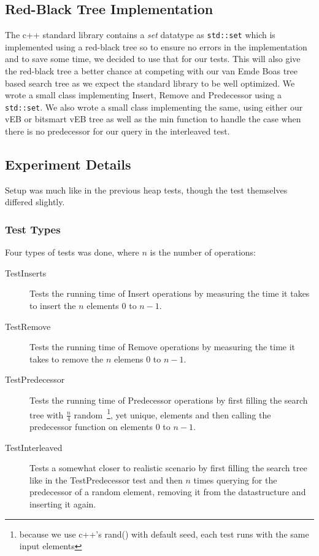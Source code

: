 \subsection{Red-Black Tree Implementation}
The c++ standard library contains a \textit{set} datatype as \texttt{std::set} which is implemented using a red-black tree so to ensure no errors in the implementation and to save some time, we decided to use that for our tests. This will also give the red-black tree a better chance at competing with our van Emde Boas tree based search tree as we expect the standard library to be well optimized. We wrote a small class implementing Insert, Remove and Predecessor using a \texttt{std::set}. We also wrote a small class implementing the same, using either our vEB or bitsmart vEB tree as well as the min function to handle the case when there is no predecessor for our query in the interleaved test.

\subsection{Experiment Details}
Setup was much like in the previous heap tests, though the test themselves differed slightly.

\subsubsection{Test Types}
Four types of tests was done, where $n$ is the number of operations:
\begin{description}
\item[TestInserts] Tests the running time of Insert operations by measuring the time it takes to insert the $n$ elements $0$ to $n-1$.
\item[TestRemove] Tests the running time of Remove operations by measuring the time it takes to remove the $n$ elemens $0$ to $n-1$.
\item[TestPredecessor] Tests the running time of Predecessor operations by first filling the search tree with $\frac{n}{4}$ random~\footnote{because we use c++'s rand() with default seed, each test runs with the same input elements}, yet unique, elements and then calling the predecessor function on elements $0$ to $n-1$.
\item[TestInterleaved] Tests a somewhat closer to realistic scenario by first filling the search tree like in the TestPredecessor test and then $n$ times querying for the predecessor of a random element, removing it from the datastructure and inserting it again.
\end{description}

